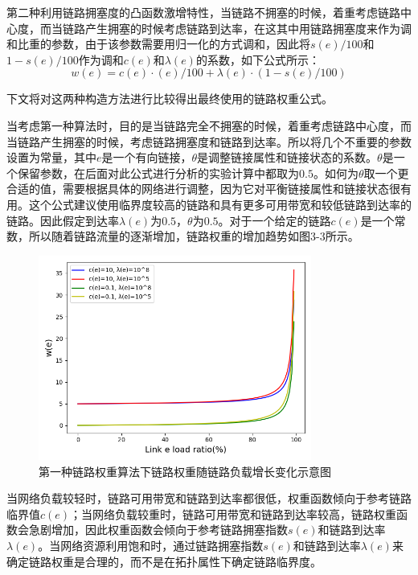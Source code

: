 第二种利用链路拥塞度的凸函数激增特性，当链路不拥塞的时候，着重考虑链路中心度，而当链路产生拥塞的时候考虑链路到达率，在这其中用链路拥塞度来作为调和比重的参数，由于该参数需要用归一化的方式调和，因此将$s(e)/100$和$1-s(e)/100$作为调和$c(e)$和$\lambda(e)$的系数，如下公式所示：
$$w(e) = c(e) \cdot (e)/100 + \lambda(e) \cdot (1-s(e)/100)$$

下文将对这两种构造方法进行比较得出最终使用的链路权重公式。

当考虑第一种算法时，目的是当链路完全不拥塞的时候，着重考虑链路中心度，而当链路产生拥塞的时候，考虑链路拥塞度和链路到达率。所以将几个不重要的参数设置为常量，其中$e$是一个有向链接，$\theta$是调整链接属性和链接状态的系数。$\theta$是一个保留参数，在后面对此公式进行分析的实验计算中都取为$0.5$。如何为$\theta$取一个更合适的值，需要根据具体的网络进行调整，因为它对平衡链接属性和链接状态很有用。这个公式建议使用临界度较高的链路和具有更多可用带宽和较低链路到达率的链路。因此假定到达率$\lambda\left(e\right)$为$0.5$，$\theta$为$0.5$。对于一个给定的链路$c\left(e\right)$是一个常数，所以随着链路流量的逐渐增加，链路权重的增加趋势如图3-3所示。

\begin{figure}[htbp]
\setlength{\abovecaptionskip}{15pt plus 3pt minus 2pt}
\centerline{\includegraphics[width=0.8\textwidth]{./figures/ch3-link-weight-function-1.png}}
\caption{第一种链路权重算法下链路权重随链路负载增长变化示意图}
\label{fig-ch3-link-weight-function-1}
\end{figure}

当网络负载较轻时，链路可用带宽和链路到达率都很低，权重函数倾向于参考链路临界值$c\left(e\right)$；当网络负载较重时，链路可用带宽和链路到达率较高，链路权重函数会急剧增加，因此权重函数会倾向于参考链路拥塞指数$s\left(e\right)$和链路到达率$\lambda\left(e\right)$。当网络资源利用饱和时，通过链路拥塞指数$s\left(e\right)$和链路到达率$\lambda\left(e\right)$来确定链路权重是合理的，而不是在拓扑属性下确定链路临界度。

